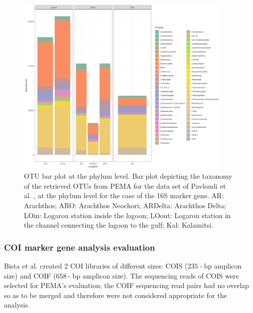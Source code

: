       \begin{figure}
         \centering
         \includegraphics[width=105mm]{figures/giaa022fig3.jpeg}
         \caption[OTU bar plot at the phylum level.]{
            OTU bar plot at the phylum level. Bar plot depicting the taxonomy of the retrieved OTUs from PEMA for the data set of Pavloudi et al. \citep{pavloudi2017sediment}, at the phylum level for the case of the 16S marker gene. AR: Arachthos; ARO: Arachthos Neochori; ARDelta: Arachthos Delta; LOin: Logarou station inside the lagoon; LOout: Logarou station in the channel connecting the lagoon to the gulf; Kal: Kalamitsi.
         }
         \label{fig:pema-barplot}
      \end{figure}


   \subsubsection*{COI marker gene analysis evaluation}

      Bista et al. \citep{bista2017annual} created 2 COI libraries of different sizes: COIS ($235$ - bp amplicon size) and COIF ($658$ - bp amplicon size). 
      The sequencing reads of COIS were selected for PEMA's evaluation; 
      the COIF sequencing read pairs had no overlap so as to be merged and therefore were not considered appropriate for the analysis.

